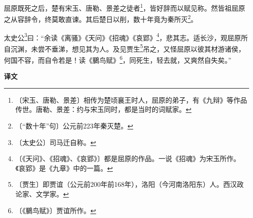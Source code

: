 \documentclass[12pt,UTF-8,openany,a4]{ctexbook}
\begin{document}
\begin{large}
    屈原既死之后，楚有宋玉、唐勒、景差之徒者\footnote{〔宋玉、唐勒、景差〕\yiwen 相传为楚顷襄王时人，屈原的弟子，有《九辩》等作品传世。唐勒、景差：约与宋玉同时，都是当时的词赋家。}，皆好辞而以赋见称。然皆祖屈原之从容辞令，终莫敢直谏。其后楚日以削，数十年竟为秦所灭\footnote{〔“数十年”句〕\yiwen 公元前223年秦灭楚。}。
    
    太史公\footnote{〔太史公〕\yiwen 司马迁自称。}曰：“余读《离骚》《天问》《招魂》《哀郢》\footnote{〔《天问》、《招魂》、《哀郢》〕\yiwen 都是屈原的作品。一说《招魂》为宋玉所作。《哀郢》是《九章》中的一篇。}，悲其志。适长沙，观屈原所自沉渊，未尝不垂涕，想见其为人。及见贾生\footnote{〔贾生〕\yiwen 即贾谊（公元前200年前168年），洛阳（今河南洛阳东）人。西汉政论家、文学家。}吊之，又怪屈原以彼其材游诸侯，何国不容，而自令若是！读《鵩鸟赋》\footnote{〔《鵩鸟赋》〕\yiwen 贾谊所作。}，同死生，轻去就，又爽然自失矣。”
\end{large}


\newpage

\begin{Large}
    \noindent\textbf{译文}
\end{Large}


\vspace{1em}
\end{document}
